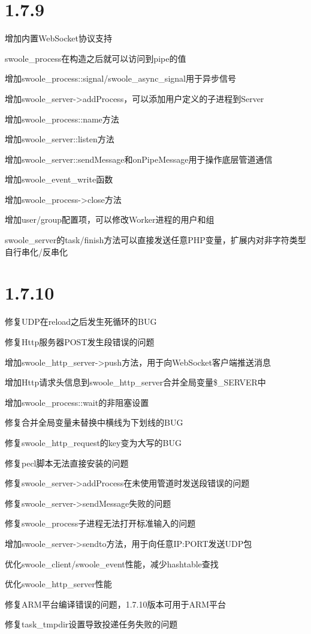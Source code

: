 \section{1.7.9}


\begin{compactitem}
\item 增加内置WebSocket协议支持
\item swoole\_process在构造之后就可以访问到pipe的值
\item 增加swoole\_process::signal/swoole\_async\_signal用于异步信号
\item 增加swoole\_server->addProcess，可以添加用户定义的子进程到Server
\item 增加swoole\_process::name方法
\item 增加swoole\_server::listen方法
\item 增加swoole\_server::sendMessage和onPipeMessage用于操作底层管道通信
\item 增加swoole\_event\_write函数
\item 增加swoole\_process->close方法
\item 增加user/group配置项，可以修改Worker进程的用户和组
\item swoole\_server的task/finish方法可以直接发送任意PHP变量，扩展内对非字符类型自行串化/反串化
\end{compactitem}

\section{1.7.10}



\begin{compactitem}
\item 修复UDP在reload之后发生死循环的BUG
\item 修复Http服务器POST发生段错误的问题
\item 增加swoole\_http\_server->push方法，用于向WebSocket客户端推送消息
\item 增加Http请求头信息到swoole\_http\_server合并全局变量\$\_SERVER中
\item 增加swoole\_process::wait的非阻塞设置
\item 修复合并全局变量未替换中横线为下划线的BUG
\item 修复swoole\_http\_request的key变为大写的BUG
\item 修复pecl脚本无法直接安装的问题
\item 修复swoole\_server->addProcess在未使用管道时发送段错误的问题
\item 修复swoole\_server->sendMessage失败的问题
\item 修复swoole\_process子进程无法打开标准输入的问题
\item 增加swoole\_server->sendto方法，用于向任意IP:PORT发送UDP包
\item 优化swoole\_client/swoole\_event性能，减少hashtable查找
\item 优化swoole\_http\_server性能
\item 修复ARM平台编译错误的问题，1.7.10版本可用于ARM平台
\item 修复task\_tmpdir设置导致投递任务失败的问题
\end{compactitem}



